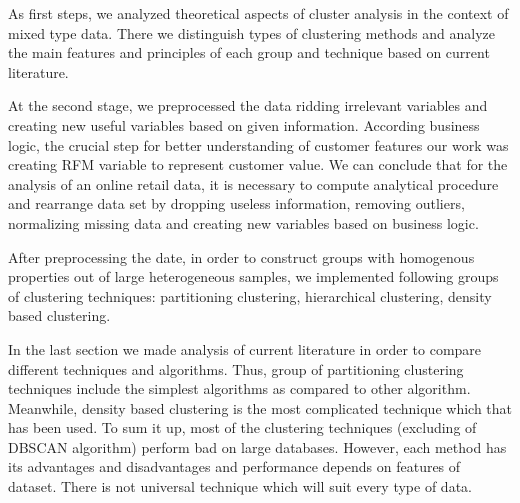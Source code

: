 \documentclass[a4paper,12pt,fleqn]{article}
\begin{document}
As first steps, we analyzed theoretical aspects of cluster analysis in the context of mixed type data. There we distinguish types of clustering methods and analyze the main features and principles of each group and technique based on current literature.

At the second stage, we preprocessed the data ridding irrelevant variables and creating new useful variables based on given information. According business logic, the crucial step for better understanding of customer features our work was creating RFM variable to represent customer value. We can conclude that for the analysis of an online retail data, it is necessary to compute analytical procedure and rearrange data set by dropping useless information, removing outliers, normalizing missing data and creating new variables based on business logic.

After preprocessing the date, in order to construct groups with homogenous properties out of large heterogeneous samples, we implemented following groups of clustering techniques: partitioning clustering, hierarchical clustering, density based clustering.

In the last section we made analysis of current literature in order to compare different techniques and algorithms. Thus, group of partitioning clustering techniques include the simplest algorithms as compared to other algorithm. Meanwhile, density based clustering is the most complicated technique which that has been used. To sum it up, most of the clustering techniques (excluding of DBSCAN algorithm) perform bad on large databases. However, each method has its advantages and disadvantages and performance depends on features of dataset. There is not universal technique which will suit every type of data.


\newpage
\end{document}
